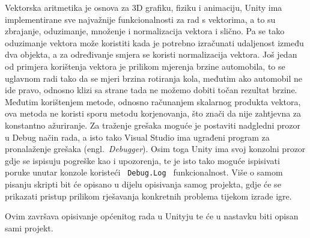 Vektorska aritmetika je osnova za 3D grafiku, fiziku i animaciju, Unity ima implementirane sve najvažnije funkcionalnosti za rad s vektorima, a to su zbrajanje, oduzimanje, množenje i normalizacija vektora i slično. Pa se tako oduzimanje vektora može koristiti kada je potrebno izračunati udaljenost između dva objekta, a za određivanje smjera se koristi normalizacija vektora. Još jedan od primjera korištenja vektora je prilikom mjerenja brzine automobila, to se uglavnom radi tako da se mjeri brzina rotiranja kola, međutim ako automobil ne ide pravo, odnosno klizi sa strane tada ne možemo dobiti točan rezultat brzine. Međutim korištenjem metode, odnosno računanjem skalarnog produkta vektora, ova metoda ne koristi sporu metodu korjenovanja, što znači da nije zahtjevna za konstantno ažuriranje.
Za traženje grešaka moguće je postaviti nadgledni prozor u Debug način rada, a isto tako Visual Studio ima ugrađeni program za pronalaženje grešaka (engl.~\textit{Debugger}). Osim toga Unity ima svoj konzolni prozor gdje se ispisuju pogreške kao i upozorenja, te je isto tako moguće ispisivati poruke unutar konzole koristeći \texttt{ Debug.Log } funkcionalnost.
Više o samom pisanju skripti bit će opisano u dijelu opisivanja samog projekta, gdje će se prikazati pristup prilikom rješavanja konkretnih problema tijekom izrade igre.

Ovim završava opisivanje općenitog rada u Unityju te će u nastavku biti opisan sami projekt.